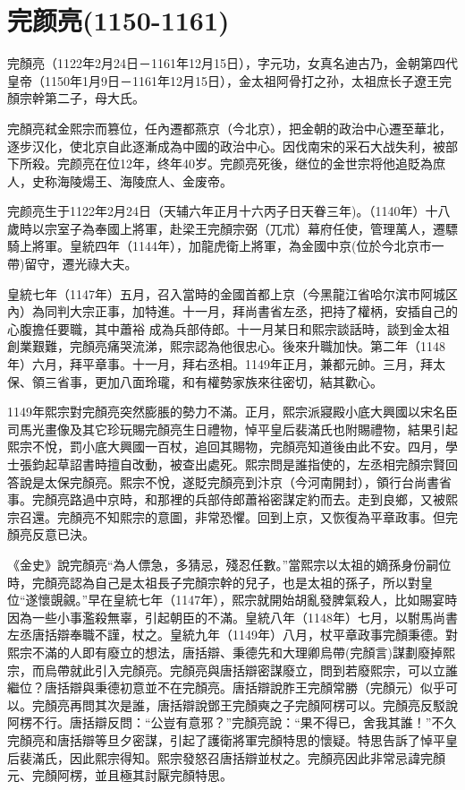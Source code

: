 
\section{完颜亮\tiny(1150-1161)}

完顏亮（1122年2月24日－1161年12月15日），字元功，女真名迪古乃，金朝第四代皇帝（1150年1月9日－1161年12月15日），金太祖阿骨打之孙，太祖庶长子遼王完顏宗幹第二子，母大氏。

完顏亮弒金熙宗而篡位，任內遷都燕京（今北京），把金朝的政治中心遷至華北，逐步汉化，使北京自此逐漸成為中國的政治中心。因伐南宋的采石大战失利，被部下所殺。完颜亮在位12年，终年40岁。完颜亮死後，继位的金世宗将他追貶為庶人，史称海陵煬王、海陵庶人、金废帝。

完颜亮生于1122年2月24日（天辅六年正月十六丙子日天眷三年)。（1140年）十八歲時以宗室子為奉國上將軍，赴梁王完顏宗弼（兀朮）幕府任使，管理萬人，遷驃騎上將軍。皇統四年（1144年），加龍虎衛上將軍，為金國中京(位於今北京市一帶)留守，遷光祿大夫。

皇統七年（1147年）五月，召入當時的金國首都上京（今黑龍江省哈尔滨市阿城区內）為同判大宗正事，加特進。十一月，拜尚書省左丞，把持了權柄，安插自己的心腹擔任要職，其中蕭裕 成為兵部侍郎。十一月某日和熙宗談話時，談到金太祖創業艱難，完顏亮痛哭流涕，熙宗認為他很忠心。後來升職加快。第二年（1148年）六月，拜平章事。十一月，拜右丞相。1149年正月，兼都元帥。三月，拜太保、領三省事，更加八面玲瓏，和有權勢家族來往密切，結其歡心。

1149年熙宗對完顏亮突然膨脹的勢力不滿。正月，熙宗派寢殿小底大興國以宋名臣司馬光畫像及其它珍玩賜完顏亮生日禮物，悼平皇后裴滿氏也附賜禮物，結果引起熙宗不悅，罰小底大興國一百杖，追回其賜物，完顏亮知道後由此不安。四月，學士張鈞起草詔書時擅自改動，被查出處死。熙宗問是誰指使的，左丞相完顏宗賢回答說是太保完顏亮。熙宗不悅，遂貶完顏亮到汴京（今河南開封），領行台尚書省事。完顏亮路過中京時，和那裡的兵部侍郎蕭裕密謀定約而去。走到良鄉，又被熙宗召還。完顏亮不知熙宗的意圖，非常恐懼。回到上京，又恢復為平章政事。但完顏亮反意已決。

《金史》說完顏亮“為人僄急，多猜忌，殘忍任數。”當熙宗以太祖的嫡孫身份嗣位時，完顏亮認為自己是太祖長子完顏宗幹的兒子，也是太祖的孫子，所以對皇位“遂懷覬覦。”早在皇統七年（1147年），熙宗就開始胡亂發脾氣殺人，比如賜宴時因為一些小事濫殺無辜，引起朝臣的不滿。皇統八年（1148年）七月，以駙馬尚書左丞唐括辯奉職不謹，杖之。皇統九年（1149年）八月，杖平章政事完顏秉德。對熙宗不滿的人即有廢立的想法，唐括辯、秉德先和大理卿烏帶(完顏言)謀劃廢掉熙宗，而烏帶就此引入完顏亮。完顏亮與唐括辯密謀廢立，問到若廢熙宗，可以立誰繼位？唐括辯與秉德初意並不在完顏亮。唐括辯說胙王完顏常勝（完顏元）似乎可以。完顏亮再問其次是誰，唐括辯說鄧王完顏奭之子完顏阿楞可以。完顏亮反駁說阿楞不行。唐括辯反問：“公豈有意邪？”完顏亮說：“果不得已，舍我其誰！”不久完顏亮和唐括辯等旦夕密謀，引起了護衛將軍完顏特思的懷疑。特思告訴了悼平皇后裴滿氏，因此熙宗得知。熙宗發怒召唐括辯並杖之。完顏亮因此非常忌諱完顏元、完顏阿楞，並且極其討厭完顏特思。

